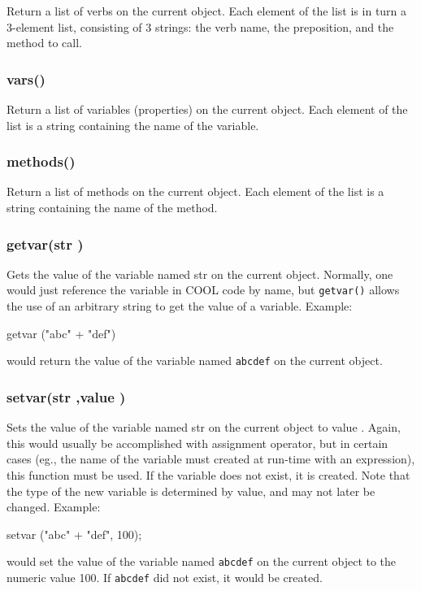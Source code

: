 Return a list of verbs on the current object.  Each element of the list
is in turn a 3-element list, consisting of 3 strings:  the verb
name, the preposition, and the method to call.

\subsubsection{\func vars()}

Return a list of variables (properties) on the current object.  Each
element of the list is a string containing the name of the variable.

\subsubsection{\func methods()}

Return a list of methods on the current object.  Each element of the list
is a string containing the name of the method.

\subsubsection{\func getvar({\funcarg str })}

Gets the value of the variable named {\funcarg str } on the current
object.  Normally, one would just reference the variable in COOL code
by name, but {\tt getvar()} allows the use of an arbitrary string to
get the value of a variable.  Example:
\begin{code}
getvar ("abc" + "def")
\end{code}
would return the value of the variable named {\tt abcdef} on the current
object.

\subsubsection{\func setvar({\funcarg str },{\funcarg value })}

Sets the value of the variable named {\funcarg str } on the current
object to {\funcarg value }.  Again, this would usually be
accomplished with assignment operator, but in certain cases (eg., the
name of the variable must created at run-time with an expression),
this function must be used.  If the variable does not exist, it is
created.  Note that the type of the new variable is determined by
{\funcarg value}, and may not later be changed.
Example:
\begin{code}
setvar ("abc" + "def", 100);
\end{code}
would set the value of the variable named {\tt abcdef} on the current
object to the numeric value 100.  If {\tt abcdef} did not exist, it
would be created.

